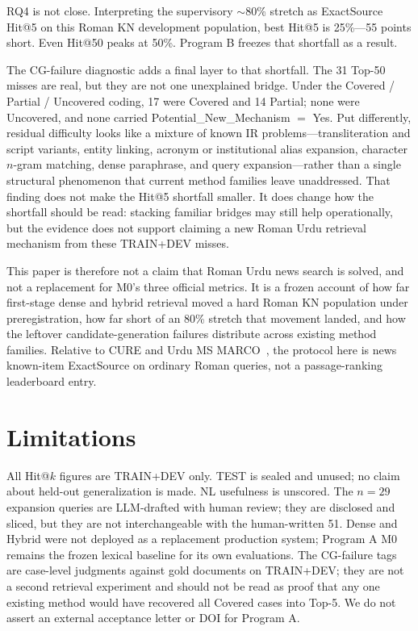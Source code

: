 \documentclass[10pt,letterpaper]{article}
\begin{document}
RQ4 is not close. Interpreting the supervisory $\sim$80\% stretch as ExactSource Hit@5 on this Roman KN development population, best Hit@5 is 25\%---55 points short. Even Hit@50 peaks at 50\%. Program B freezes that shortfall as a result.

The CG-failure diagnostic adds a final layer to that shortfall. The 31 Top-50 misses are real, but they are not one unexplained bridge. Under the Covered / Partial / Uncovered coding, 17 were Covered and 14 Partial; none were Uncovered, and none carried Potential\_New\_Mechanism $=$ Yes. Put differently, residual difficulty looks like a mixture of known IR problems---transliteration and script variants, entity linking, acronym or institutional alias expansion, character $n$-gram matching, dense paraphrase, and query expansion---rather than a single structural phenomenon that current method families leave unaddressed. That finding does not make the Hit@5 shortfall smaller. It does change how the shortfall should be read: stacking familiar bridges may still help operationally, but the evidence does not support claiming a new Roman Urdu retrieval mechanism from these TRAIN+DEV misses.

This paper is therefore not a claim that Roman Urdu news search is solved, and not a replacement for M0's three official metrics. It is a frozen account of how far first-stage dense and hybrid retrieval moved a hard Roman KN population under preregistration, how far short of an 80\% stretch that movement landed, and how the leftover candidate-generation failures distribute across existing method families. Relative to CURE and Urdu MS MARCO~\cite{bib5,bib6}, the protocol here is news known-item ExactSource on ordinary Roman queries, not a passage-ranking leaderboard entry.

\section*{Limitations}
All Hit@$k$ figures are TRAIN+DEV only. TEST is sealed and unused; no claim about held-out generalization is made. NL usefulness is unscored. The $n = 29$ expansion queries are LLM-drafted with human review; they are disclosed and sliced, but they are not interchangeable with the human-written 51. Dense and Hybrid were not deployed as a replacement production system; Program A M0 remains the frozen lexical baseline for its own evaluations. The CG-failure tags are case-level judgments against gold documents on TRAIN+DEV; they are not a second retrieval experiment and should not be read as proof that any one existing method would have recovered all Covered cases into Top-5. We do not assert an external acceptance letter or DOI for Program A.
\end{document}
